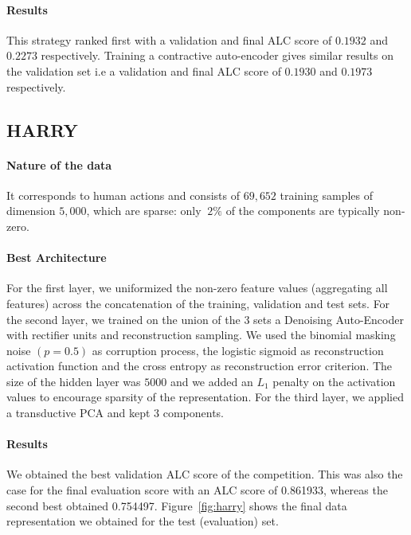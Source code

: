 \paragraph{Results}
This strategy ranked first with a validation and final ALC score of $0.1932$
and $0.2273$ respectively. Training a contractive auto-encoder gives similar
results on the validation set i.e a validation and final ALC score of $0.1930$
and $0.1973$ respectively.
\subsection{HARRY}



\paragraph{Nature of the data} It corresponds to human actions and consists of
$69,652$ training samples of dimension $5,000$, which are
sparse: only $~2\%$ of the components
are typically non-zero.

\paragraph{Best Architecture} For the first layer, we uniformized the non-zero
feature values (aggregating all features)
across the concatenation of the training, validation and test
sets.  For the second layer, we trained on the union of the 3 sets a Denoising
Auto-Encoder with rectifier units and reconstruction sampling. We used the
binomial masking noise $(p=0.5)$ as corruption process, the logistic sigmoid as
reconstruction activation function and the cross entropy as reconstruction
error criterion.  The size of the hidden layer was $5000$ 
and we added an $L_1$ penalty on the activation values to encourage sparsity of
the representation. For the third layer, we applied a transductive PCA and kept
$3$ components.

\paragraph{Results} We obtained the best validation ALC score of the
competition.  This was also the case for the final evaluation score with an ALC
score of 0.861933, whereas the second best obtained 0.754497.
Figure~\ref{fig:harry} shows the final data representation we obtained for the
test (evaluation) set. 

